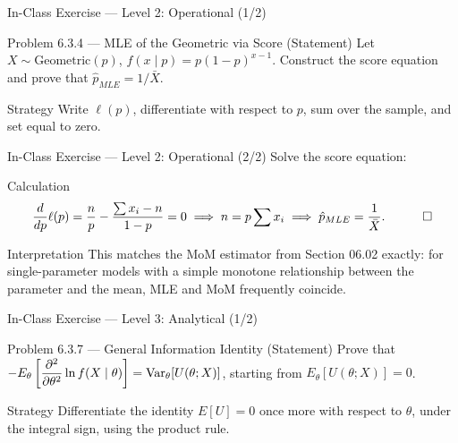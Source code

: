 \documentclass[aspectratio=169,xcolor={dvipsnames,table}]{beamer}
\begin{document}
\begin{frame}{In-Class Exercise --- Level 2: Operational (1/2)}
	\vspace{-0.1cm}
	\begin{block}{Problem 6.3.4 --- MLE of the Geometric via Score (Statement)}
		Let $X\sim\text{Geometric}(p)$, $f(x\mid p)=p(1-p)^{x-1}$. Construct the score equation and prove that $\hat p_{MLE}=1/\bar X$.
	\end{block}
	\vspace{0.15cm}
	\pause
	\begin{alertblock}{Strategy}
		\scriptsize
		Write $\ell(p)$, differentiate with respect to $p$, sum over the sample, and set equal to zero.
	\end{alertblock}
\end{frame}

\begin{frame}{In-Class Exercise --- Level 2: Operational (2/2)}
	\vspace{-0.05cm}
	\scriptsize
	Solve the score equation: \pause
	\begin{block}{Calculation}
		\begin{align*}
			\frac{d}{dp}\ell(p) = \frac{n}{p} - \frac{\sum x_i-n}{1-p} = 0 \implies n = p\sum x_i \implies \hat p_{MLE} = \frac{1}{\bar X}. \quad \qedhere
		\end{align*}
	\end{block}
	\vspace{0.05cm}
	\pause
	\begin{alertblock}{Interpretation}
		\scriptsize
		This matches the MoM estimator from Section 06.02 exactly: for single-parameter models with a simple monotone relationship between the parameter and the mean, MLE and MoM frequently coincide.
	\end{alertblock}
\end{frame}

\begin{frame}{In-Class Exercise --- Level 3: Analytical (1/2)}
	\vspace{-0.1cm}
	\begin{block}{Problem 6.3.7 --- General Information Identity (Statement)}
		Prove that $-E_\theta\left[\dfrac{\partial^2}{\partial\theta^2}\ln f(X\mid\theta)\right] = \operatorname{Var}_\theta[U(\theta;X)]$, starting from $E_\theta[U(\theta;X)]=0$.
	\end{block}
	\vspace{0.1cm}
	\pause
	\begin{alertblock}{Strategy}
		\scriptsize
		Differentiate the identity $E[U]=0$ once more with respect to $\theta$, under the integral sign, using the product rule.
	\end{alertblock}
\end{frame}
\end{document}
